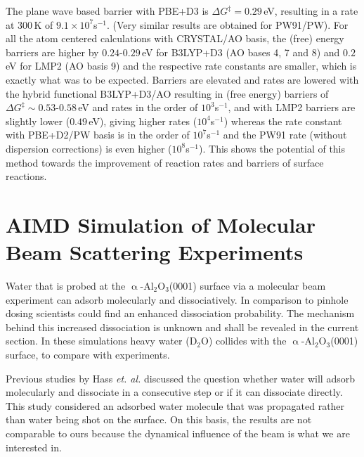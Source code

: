 \documentclass[11pt,DIV=13,BCOR=5mm,a4paper,headinclude]{scrbook}
\begin{document}
The plane wave based barrier with PBE+D3 is $\Delta G^\ddagger=0.29\,$eV, resulting in a rate at $300\,$K of $9.1\times 10^7$s$^{-1}$.
(Very similar results are obtained for PW91/PW).
For all the atom centered calculations with CRYSTAL/AO basis, the (free) energy barriers are higher by $0.24$-$0.29\,$eV for B3LYP+D3 (AO bases 4, 7 and 8) and $0.2\,$eV for LMP2 (AO basis 9) and the respective rate constants are smaller, which is exactly what was to be expected.
Barriers are elevated and rates are lowered with the hybrid functional B3LYP+D3/AO resulting in (free energy) barriers of $\Delta G^\ddagger\sim0.53$-$0.58\,$eV and rates in the order of $10^3$s$^{-1}$, and with LMP2 barriers are slightly lower ($0.49\,$eV), giving higher rates ($10^4$s$^{-1}$) whereas the rate constant with PBE+D2/PW basis is in the order of $10^7$s$^{-1}$ and the PW91 rate (without dispersion corrections) is even higher ($10^8$s$^{-1}$). 
This shows the potential of this method towards the improvement of reaction rates and barriers of surface reactions.

  
\section[AIMD Simulation of Molecular Beam Scattering Experiments]{AIMD Simulation of Molecular Beam Scattering Experiments\cite{Heiden0001_2018}}\label{sec_0001AIMD}
Water that is probed at the $\upalpha$-Al$_2$O$_3$(0001) surface via a molecular beam experiment can adsorb molecularly and dissociatively.
In comparison to pinhole dosing scientists could find an enhanced dissociation probability\cite{Heiden0001_2018}.
The mechanism behind this increased dissociation is unknown and shall be revealed in the current section.
In these simulations heavy water (D$_2$O) collides with the $\upalpha$-Al$_{\text{2}}$O$_{\text{3}}$(0001) surface, to compare with experiments.


Previous studies by Hass \textit{et. al.}\cite{hass98,hass00} discussed the question whether water will adsorb molecularly and dissociate in a consecutive step or if it can dissociate directly.
This study considered an adsorbed water molecule that was propagated rather than water being shot on the surface.
On this basis, the results are not comparable to ours because the dynamical influence of the beam is what we are interested in.
\end{document}
